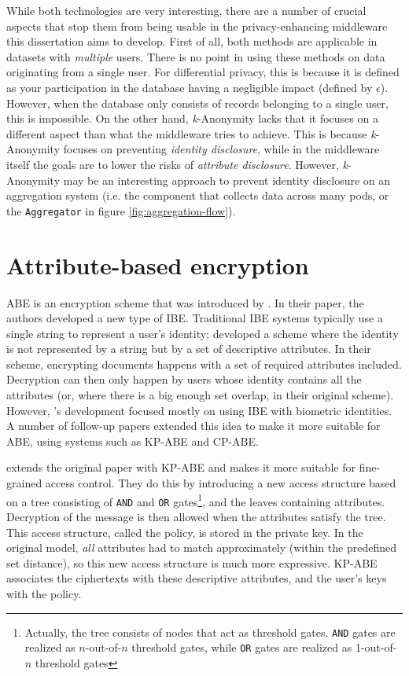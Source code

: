 While both technologies are very interesting, there are a number of crucial aspects that stop them from being usable in the privacy-enhancing middleware this dissertation aims to develop. First of all, both methods are applicable in datasets with \textit{multiple} users. There is no point in using these methods on data originating from a single user. For differential privacy, this is because it is defined as your participation in the database having a negligible impact (defined by $\epsilon$). However, when the database only consists of records belonging to a single user, this is impossible. On the other hand, \textit{k}-Anonymity lacks that it focuses on a different aspect than what the middleware tries to achieve. This is because \textit{k}-Anonymity focuses on preventing \textit{identity disclosure}, while in the middleware itself the goals are to lower the risks of \textit{attribute disclosure}. However, \textit{k}-Anonymity may be an interesting approach to prevent identity disclosure on an aggregation system (i.e. the component that collects data across many pods, or the \texttt{Aggregator} in figure \ref{fig:aggregation-flow}).

\section{Attribute-based encryption}
\Gls{ABE} is an encryption scheme that was introduced by \citet*{fuzzy-ibe}. In their paper, the authors developed a new type of \gls{IBE}. Traditional \gls{IBE} systems typically use a single string to represent a user's identity; \citeauthor*{fuzzy-ibe} developed a scheme where the identity is not represented by a string but by a set of descriptive attributes. In their scheme, encrypting documents happens with a set of required attributes included. Decryption can then only happen by users whose identity contains all the attributes (or, where there is a big enough set overlap, in their original scheme). However, \citeauthor*{fuzzy-ibe}'s development focused mostly on using \gls{IBE} with biometric identities. A number of follow-up papers extended this idea to make it more suitable for \gls{ABE}, using systems such as \gls{KP-ABE} and \gls{CP-ABE}.

\citet{kp-abe} extends the original paper with \gls{KP-ABE} and makes it more suitable for fine-grained access control. They do this by introducing a new access structure based on a tree consisting of \texttt{AND} and \texttt{OR} gates\footnote{Actually, the tree consists of nodes that act as threshold gates. \texttt{AND} gates are realized as $n$-out-of-$n$ threshold gates, while \texttt{OR} gates are realized as 1-out-of-$n$ threshold gates}, and the leaves containing attributes. Decryption of the message is then allowed when the attributes satisfy the tree. This access structure, called the policy, is stored in the private key. In the original model, \textit{all} attributes had to match approximately (within the predefined set distance), so this new access structure is much more expressive. \Gls{KP-ABE} associates the ciphertexts with these descriptive attributes, and the user's keys with the policy.

